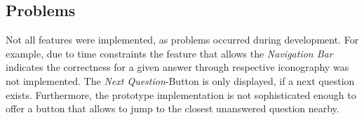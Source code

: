 \subsection{Problems}
Not all features were implemented, as problems occurred during development. For example, due to time constraints the feature that allows the \emph{Navigation Bar} indicates the correctness for a given answer through respective iconography was not implemented. The \emph{Next Question}-Button is only displayed, if a next question exists. Furthermore, the prototype implementation is not sophisticated enough to offer a button that allows to jump to the closest unanswered question nearby.